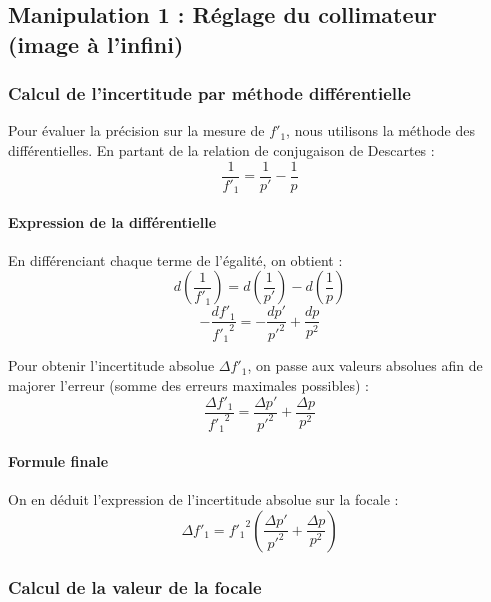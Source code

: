 \subsection{Manipulation 1 : Réglage du collimateur (image à l'infini)}

\subsubsection{Calcul de l'incertitude par méthode différentielle}

Pour évaluer la précision sur la mesure de $f'_1$,
nous utilisons la méthode des différentielles.
En partant de la relation de conjugaison de Descartes :
\begin{equation}
    \frac{1}{f'_1} = \frac{1}{p'} - \frac{1}{p}
\end{equation}

\paragraph{Expression de la différentielle}
En différenciant chaque terme de l'égalité, on obtient :
\begin{equation}
    d\left(\frac{1}{f'_1}\right) = d\left(\frac{1}{p'}\right) - d\left(\frac{1}{p}\right)
\end{equation}
\begin{equation}
    -\frac{df'_1}{{f'_1}^2} = -\frac{dp'}{{p'}^2} + \frac{dp}{p^2}
\end{equation}

Pour obtenir l'incertitude absolue $\Delta f'_1$,
on passe aux valeurs absolues afin de majorer l'erreur
(somme des erreurs maximales possibles) :
\begin{equation}
    \frac{\Delta f'_1}{{f'_1}^2} = \frac{\Delta p'}{{p'}^2} + \frac{\Delta p}{p^2}
\end{equation}

\paragraph{Formule finale}
On en déduit l'expression de l'incertitude absolue sur la focale :
\begin{equation}
    \Delta f'_1 = {f'_1}^2 \left( \frac{\Delta p'}{{p'}^2} + \frac{\Delta p}{p^2} \right)
\end{equation}

\subsubsection{Calcul de la valeur de la focale}

